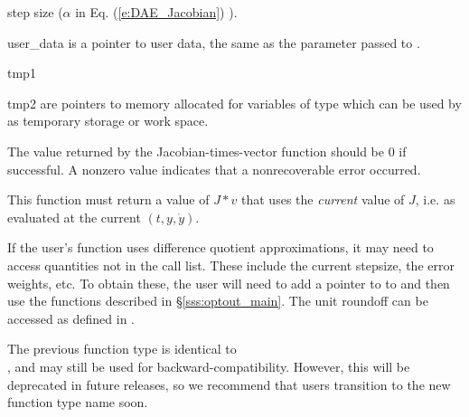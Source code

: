 {{\begin{args}
    step size ($\alpha$ in Eq. (\ref{e:DAE_Jacobian}) ).
  \item[user\_data]
    is a pointer to user data, the same as the 
    parameter passed to .
  \item[tmp1]
  \item[tmp2]
    are pointers to memory allocated for variables of type  which
    can be used by  as temporary storage or work space.
  \end{args}
}
{
  The value returned by the Jacobian-times-vector function should be 0 if
  successful.  A nonzero value indicates that a nonrecoverable error occurred.
}
{
  This function must return a value of $J*v$ that uses the {\it current}
  value of $J$, i.e. as evaluated at the current $(t,y,\dot{y})$.

  If the user's  function uses difference quotient
  approximations, it may need to access quantities not in the call
  list. These include the current stepsize, the error weights, etc.
  To obtain these, the user will need to add a pointer to 
  to  and then use the  functions described in
  \S\ref{sss:optout_main}. The unit roundoff can be accessed as
   defined in .

  The previous function type  is identical to
  \\ \noindent {}, and may still be used for
  backward-compatibility. However, this will be deprecated in future
  releases, so we recommend that users transition to the new function
  type name soon.
}
}
